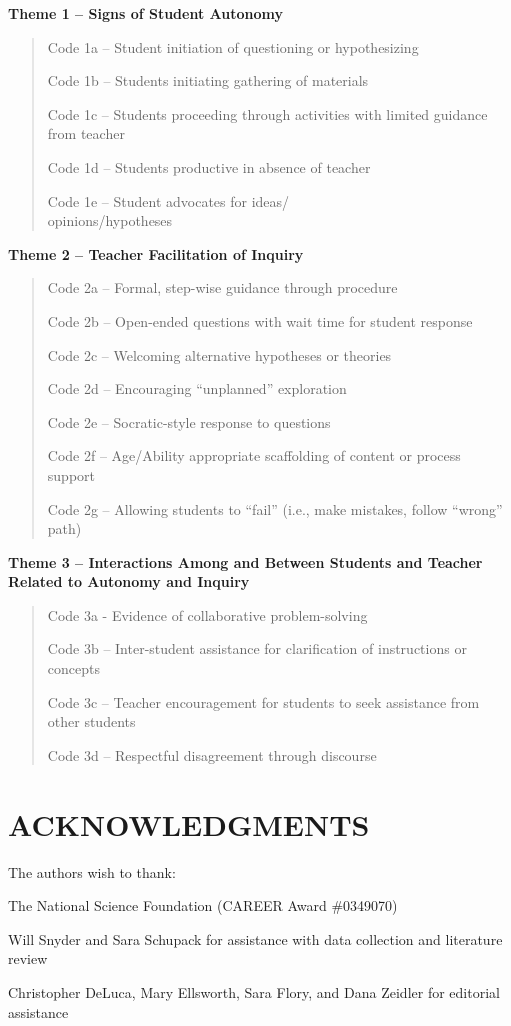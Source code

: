 \documentclass[11.5pt]{sig-alternate} %
\begin{document}
\begin{large}
\textbf{Theme 1 – Signs of Student Autonomy}

\begin{quote}
Code 1a – Student initiation of questioning or hypothesizing

Code 1b – Students initiating gathering of materials

Code 1c – Students proceeding through activities with limited guidance from teacher

Code 1d – Students productive in absence of teacher

Code 1e – Student advocates for ideas/\\opinions/hypotheses
\end{quote}

\textbf{Theme 2 – Teacher Facilitation of Inquiry}

\begin{quote}
Code 2a – Formal, step-wise guidance through procedure

Code 2b – Open-ended questions with wait time for student response

Code 2c – Welcoming alternative hypotheses or theories

Code 2d – Encouraging “unplanned” exploration

Code 2e – Socratic-style response to questions

Code 2f – Age/Ability appropriate scaffolding of content or process support

Code 2g – Allowing students to “fail” (i.e., make mistakes, follow “wrong” path)
\end{quote}

\textbf{Theme 3 – Interactions Among and Between Students and Teacher Related to Autonomy and Inquiry}

\begin{quote}
    
Code 3a - Evidence of collaborative problem-solving 

Code 3b – Inter-student assistance for clarification of instructions or concepts

Code 3c – Teacher encouragement for students to seek assistance from other students

Code 3d – Respectful disagreement through discourse
\end{quote}

\section*{ACKNOWLEDGMENTS}

The authors wish to thank:

The National Science Foundation (CAREER Award \#0349070)

Will Snyder and Sara Schupack for assistance with data collection and literature review

Christopher DeLuca, Mary Ellsworth, Sara Flory, and Dana Zeidler for editorial assistance 

\end{large}
\clearpage
\end{document}
